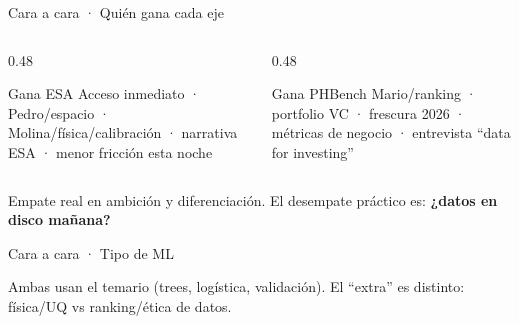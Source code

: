 \documentclass[aspectratio=169,10pt]{beamer}
\begin{document}
\begin{frame}{Cara a cara · Quién gana cada eje}
  \begin{columns}[T]
    \begin{column}{0.48\textwidth}
      \begin{block}{Gana ESA}
        \scriptsize
        Acceso inmediato · Pedro/espacio · Molina/física/calibración · narrativa ESA · menor fricción esta noche
      \end{block}
    \end{column}
    \begin{column}{0.48\textwidth}
      \begin{block}{Gana PHBench}
        \scriptsize
        Mario/ranking · portfolio VC · frescura 2026 · métricas de negocio · entrevista ``data for investing''
      \end{block}
    \end{column}
  \end{columns}
  \vspace{0.45em}
  Empate real en ambición y diferenciación. El desempate práctico es: \textbf{¿datos en disco mañana?}
\end{frame}

\begin{frame}{Cara a cara · Tipo de ML}
  \begin{center}
  \end{center}
  \vspace{0.45em}
  Ambas usan el temario (trees, logística, validación). El ``extra'' es distinto: física/UQ vs ranking/ética de datos.
\end{frame}
\end{document}

